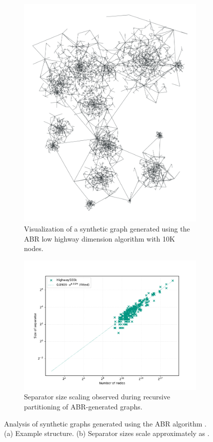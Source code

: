 \begin{figure}
	\centering
	\begin{subfigure}{0.35\linewidth}
		\centering
		\includegraphics[height=\linewidth, angle=90]{graphics/highway.png}
		\caption{Visualization of a synthetic graph generated using the ABR low highway dimension algorithm with 10K nodes.}
		\label{fig:abr_graph_viz} %
	\end{subfigure}
	\hfill
	\begin{subfigure}{0.55\linewidth}
		\centering
		\includegraphics[width=\linewidth]{graphics/sep_highway.pdf}
		\caption{Separator size scaling observed during recursive partitioning of ABR-generated graphs.}
		\label{fig:abr_graph_sep_plot} %
	\end{subfigure}
	\caption{Analysis of synthetic graphs generated using the ABR algorithm \cite{abraham_highway_2010}. (a) Example structure. (b) Separator sizes scale approximately as .}
	\label{fig:abr_graph_separators} %
\end{figure}

